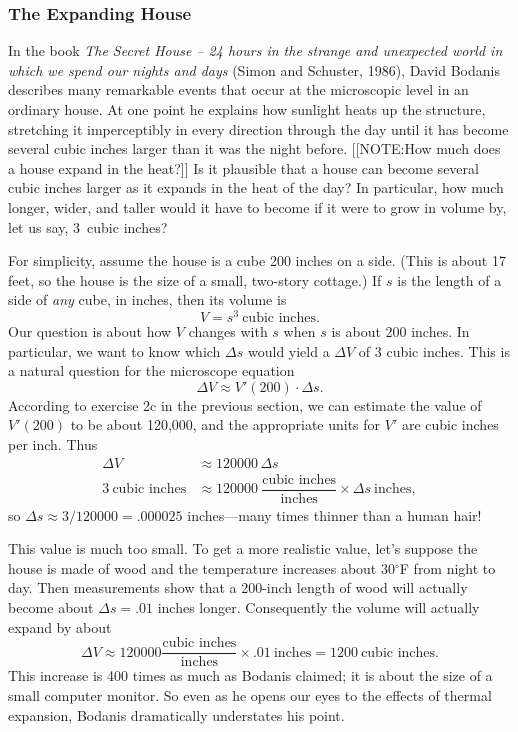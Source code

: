 \subsubsection{The Expanding House}
\label{subsubsec:the-expanding-house}

In the book {\em The Secret House -- 24 hours in the strange and
  unexpected world in which we spend our nights and days\/} (Simon and
Schuster, 1986), David Bodanis describes many remarkable events that
occur at the microscopic level in an ordinary house.  At one point he
explains how sunlight heats up the structure, stretching it
imperceptibly in every direction through the day until it has become
several cubic inches larger than it was the night before.
[[NOTE:How much does  a house expand  in the heat?]]
Is it plausible that a house can become several cubic inches larger as
it expands in the heat of the day?  In particular, how much longer,
wider, and taller would it have to become if it were to grow in volume
by, let us say, 3~cubic inches?

For simplicity, assume the house is a cube 200 inches on a side.
(This is about 17 feet, so the house is the size of a small, two-story
cottage.)  If $s$ is the length of a side of {\em any\/} cube, in
inches, then its volume is
\[
V = s^3 \ \mbox{cubic inches}.
\]
Our question is about how $V$ changes with $s$ when $s$ is about 200
inches.  In particular, we want to know which $\Delta s$ would yield a
$\Delta V$ of 3 cubic inches.  This is a natural question for the
microscope equation
\[
\Delta V \approx V'(200)\cdot \Delta s.
\]
According to exercise 2c in the previous section, we can estimate the
value of $V'(200)$ to be about 120,000, and the appropriate units for
$V'$ are cubic inches per inch.  Thus\label{house}
\begin{align*}
\Delta V &\approx 120000 \, \Delta s \\
3 \ \mbox{cubic inches} &\approx 120000 \ 
		\dfrac{\mbox{cubic inches}}{\mbox{inches}} \times
		\Delta s \ \mbox{inches},
\end{align*}
so $\Delta s \approx 3/120000 = .000025$ inches---many times thinner
than a human hair!

This value is much too small.  To get a more realistic value, let's
suppose the house is made of wood and the temperature increases about
30$^\circ$F from night to day.  Then measurements show that a 200-inch
length of wood will actually become about $\Delta s = .01$ inches
longer.  Consequently the volume will actually expand by about
\[
\Delta V \approx 120000 
		\dfrac{\mbox{cubic inches}}{\mbox{inches}} \times
		.01 \ \mbox{inches} = 1200 \ \mbox{cubic inches}.
\]
This increase is 400 times as much as Bodanis claimed; it is about the
size of a small computer monitor.  So even as he opens our eyes to the
effects of thermal expansion, Bodanis dramatically understates his
point.

